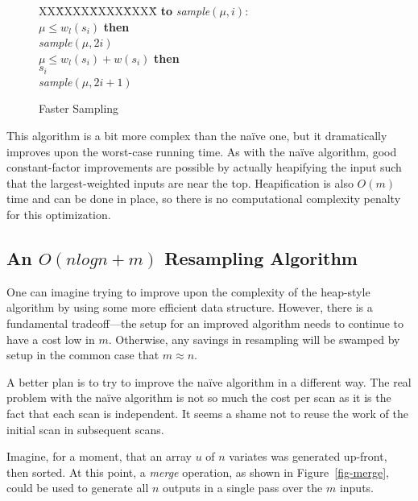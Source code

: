 \documentclass[12pt]{article}
\begin{document}
  \begin{figure}
    \centering
    \begin{minipage}{0.6\textwidth}
      \begin{tabbing}
      XX\=XXXX\=XXXX\=XXXX\=\kill
      {\bf to} {\it sample}$(\mu,i)$: \\
       $\mu \le w_l(s_i)$ {\bf then} \\
      \> {\it sample}$(\mu,2i)$\\
       $\mu \le w_l(s_i) + w(s_i)$ {\bf then} \\
      \> $s_i$\\
       {\it sample}$(\mu,2i + 1)$
    \end{tabbing}
    \end{minipage}
    \caption{Faster Sampling}\label{fig-onlm}
  \end{figure}

  This algorithm is a bit more complex than the na\"ive one,
  but it dramatically improves upon the worst-case running
  time.  As with the na\"ive algorithm, good constant-factor
  improvements are possible by actually heapifying the input
  such that the largest-weighted inputs are near the top.
  Heapification is also $O(m)$ time and can be done in
  place, so there is no computational complexity penalty for
  this optimization.

\subsection{An $O(n log n + m)$ Resampling Algorithm}

  One can imagine trying to improve upon the complexity of
  the heap-style algorithm by using some more efficient data
  structure.  However, there is a fundamental tradeoff---the
  setup for an improved algorithm needs to continue to have
  a cost low in $m$.  Otherwise, any savings in resampling
  will be swamped by setup in the common case that $m
  \approx n$.

  A better plan is to try to improve the na\"ive algorithm
  in a different way.  The real problem with the na\"ive
  algorithm is not so much the cost per scan as it is the
  fact that each scan is independent.  It seems a shame not
  to reuse the work of the initial scan in subsequent scans.

  Imagine, for a moment, that an array $u$ of $n$ variates
  was generated up-front, then sorted.  At this point, a
  {\em merge} operation, as shown in Figure~\ref{fig-merge},
  could be used to generate all $n$ outputs in a single pass
  over the $m$ inputs.
\end{document}
